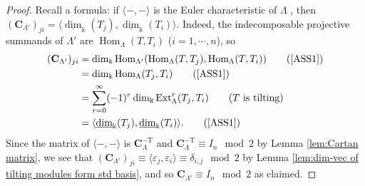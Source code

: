 \documentclass[11pt,reqno]{amsart}
\theoremstyle{plain}
\theoremstyle{definition}
\theoremstyle{remark}
\numberwithin{equation}{section}
\begin{document}
\begin{proof}
    Recall a formula: if $\langle-,-\rangle$ is the Euler characteristic of $\Lambda$ \cite[Definition III.3.11]{ASS1}, then $(\mathbf{C}_{\Lambda'})_{ji}=\langle\underline{\dim}_\Bbbk(T_j),\underline{\dim}_\Bbbk(T_i)\rangle$. Indeed, the indecomposable projective summands of $\Lambda'$ are $\mathop{\mathrm{Hom}}_\Lambda(T,T_i)$ ($i=1,\cdots,n$), so
    \begin{align}
        (\mathbf{C}_{\Lambda'})_{ji}
        &=\dim_\Bbbk\mathop{\mathrm{Hom}}\nolimits_{\Lambda'}(\mathop{\mathrm{Hom}}\nolimits_\Lambda(T,T_j),\mathop{\mathrm{Hom}}\nolimits_\Lambda(T,T_i))
        \tag{\cite[Definition 3.7, Lemma I.4.2]{ASS1}}\\
        &=\dim_\Bbbk\mathop{\mathrm{Hom}}\nolimits_\Lambda(T_j,T_i)
        \tag{\cite[Lemma VI.3.2]{ASS1}}\\
        &=\sum_{r=0}^\infty(-1)^r\dim_\Bbbk\mathop{\mathrm{Ext}}\nolimits_\Lambda^r(T_j,T_i)
        \tag{$T$ is tilting}\\
        &=\langle\underline{\dim}_\Bbbk(T_j),\underline{\dim}_\Bbbk(T_i)\rangle.
        \tag{\cite[Proposition III.3.13]{ASS1}}
    \end{align}
    Since the matrix of $\langle-,-\rangle$ is $\mathbf{C}_\Lambda^{-\mathrm{T}}$ and $\mathbf{C}_\Lambda^{-\mathrm{T}}\equiv I_n\mod2$ by Lemma \ref{lem:Cartan matrix}, we see that $(\mathbf{C}_{\Lambda'})_{ji}\equiv\langle\varepsilon_j,\varepsilon_i\rangle\equiv\delta_{i,j}\mod2$ by Lemma \ref{lem:dim-vec of tilting modules form std basis}, and so $\mathbf{C}_{\Lambda'}\equiv I_n\mod2$ as claimed. 
\end{proof}
\end{document}
